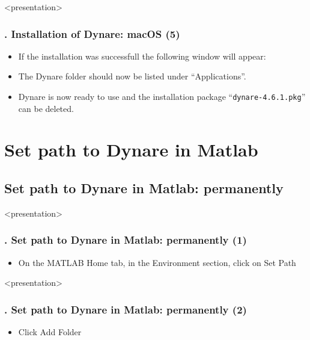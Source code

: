 \documentclass[11pt,aspectratio=169]{beamer}
\begin{document}
\begin{frame}<presentation>
	\frametitle{{\thesection.\thesubsection} Installation of Dynare: macOS (5)}
	\begin{itemize}
		\item If the installation was successfull the following window will appear:
		\begin{figure}
		\end{figure}
		\item The Dynare folder should now be listed under ``Applications''.
		\item Dynare is now ready to use and the installation package ``\texttt{dynare-4.6.1.pkg}'' can be deleted.
	\end{itemize}
\end{frame}

\section{Set path to Dynare in Matlab}

\subsection{Set path to Dynare in Matlab: permanently}

\begin{frame}<presentation>
\frametitle{{\thesection.\thesubsection} Set path to Dynare in Matlab: permanently (1)}
	\begin{itemize}
			\item On the MATLAB Home tab, in the Environment section, click on Set Path
				\begin{figure}
		\end{figure}
	\end{itemize}
\end{frame}

\begin{frame}<presentation>
\frametitle{{\thesection.\thesubsection} Set path to Dynare in Matlab: permanently (2)}
	\begin{itemize}
			\item Click Add Folder
				\begin{figure}
		\end{figure}
	\end{itemize}
\end{frame}
\end{document}
